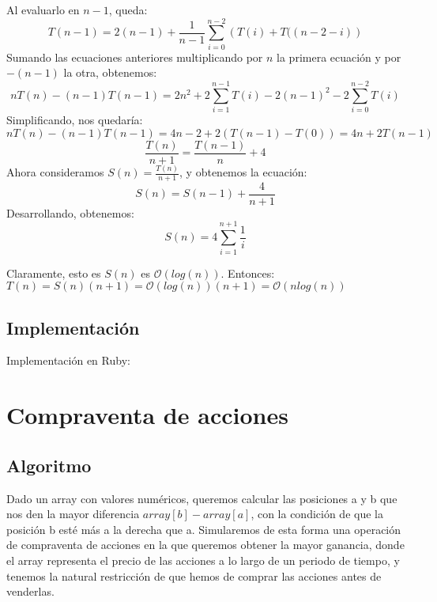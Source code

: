 \documentclass[a4paper, 11pt]{article} %
\begin{document}
      Al evaluarlo en $n-1$, queda:
      \begin{equation}
      	T(n-1) = 2(n-1) + \frac{1}{n-1}\sum_{i=0}^{n-2}\left(T(i) + T((n-2-i) \right)
      \end{equation}
      Sumando las ecuaciones anteriores multiplicando por $n$ la primera ecuación y por $-(n-1)$ la otra, obtenemos:
      \begin{equation}
        nT(n) - (n-1)T(n-1) = 2n^2 + 2\sum^{n-1}_{i=1} T(i) - 2(n-1)^2 - 2\sum_{i=0}^{n-2}T(i)
      \end{equation}
      Simplificando, nos quedaría:
	  \begin{equation}
	    nT(n) - (n-1)T(n-1) = 4n-2 + 2(T(n-1) - T(0)) = 4n + 2T(n-1) 
	  \end{equation}
	  \begin{equation}
	    \frac{T(n)}{n+1} = \frac{T(n-1)}{n} + 4
	  \end{equation}
      Ahora consideramos $S(n) = \frac{T(n)}{n+1}$, y obtenemos la ecuación:
      \begin{equation}
        S(n) = S(n-1) + \frac{4}{n+1}
      \end{equation}
      Desarrollando, obtenemos:
      \begin{equation}
        S(n) = 4 \sum^{n+1}_{i=1} \frac{1}{i}
      \end{equation}
      
      Claramente, esto es $S(n)$ es $\mathcal{O}(log(n))$. Entonces: \\
      $T(n) = S(n) (n+1) = \mathcal{O}(log(n)) (n+1) = \mathcal{O}(nlog(n))$

      \subsection{Implementación}
      Implementación en Ruby:

      \small
      \texttt{}
      \normalsize
      
      
\section {Compraventa de acciones}
\subsection{Algoritmo}
	Dado un array con valores numéricos, queremos calcular las posiciones a y b que nos den la mayor diferencia $array[b]-array[a]$, con la condición de que la posición b esté más a la derecha que a.
	Simularemos de esta forma una operación de compraventa de acciones en la que queremos obtener la mayor ganancia, donde el array representa el precio de las acciones a lo largo de un periodo de tiempo, y tenemos la natural restricción de que hemos de comprar las acciones antes de venderlas. 
	
\end{document}
